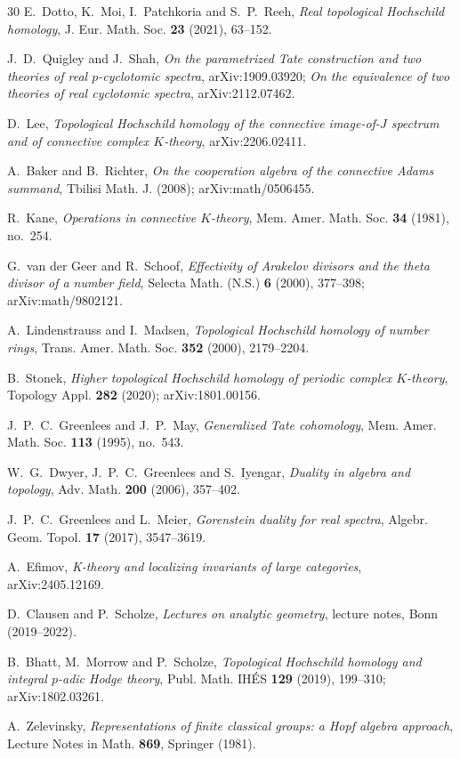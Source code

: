 \documentclass[11pt,reqno]{amsart}
\theoremstyle{plain}
\theoremstyle{definition}
\theoremstyle{remark}
\begin{document}
\begin{thebibliography}{30}
 E.~Dotto, K.~Moi, I.~Patchkoria and S.~P.~Reeh, \emph{Real topological
Hochschild homology}, J. Eur. Math. Soc. \textbf{23} (2021), 63--152.

 J.~D.~Quigley and J.~Shah, \emph{On the parametrized Tate construction and two
theories of real $p$-cyclotomic spectra}, arXiv:1909.03920; \emph{On the equivalence of two
theories of real cyclotomic spectra}, arXiv:2112.07462.

 D.~Lee, \emph{Topological Hochschild homology of the connective image-of-$J$
spectrum and of connective complex $K$-theory}, arXiv:2206.02411.

 A.~Baker and B.~Richter, \emph{On the cooperation algebra of the
connective Adams summand}, Tbilisi Math. J. (2008); arXiv:math/0506455.

 R.~Kane, \emph{Operations in connective $K$-theory}, Mem. Amer. Math. Soc.
\textbf{34} (1981), no.~254.

 G.~van der Geer and R.~Schoof, \emph{Effectivity of Arakelov divisors and the
theta divisor of a number field}, Selecta Math. (N.S.) \textbf{6} (2000), 377--398;
arXiv:math/9802121.

 A.~Lindenstrauss and I.~Madsen, \emph{Topological Hochschild homology of number
rings}, Trans. Amer. Math. Soc. \textbf{352} (2000), 2179--2204.

 B.~Stonek, \emph{Higher topological Hochschild homology of periodic complex
$K$-theory}, Topology Appl. \textbf{282} (2020); arXiv:1801.00156.

 J.~P.~C.~Greenlees and J.~P.~May, \emph{Generalized Tate cohomology},
Mem. Amer. Math. Soc. \textbf{113} (1995), no.~543.

 W.~G.~Dwyer, J.~P.~C.~Greenlees and S.~Iyengar, \emph{Duality in algebra and
topology}, Adv. Math. \textbf{200} (2006), 357--402.

 J.~P.~C.~Greenlees and L.~Meier, \emph{Gorenstein duality for real
spectra}, Algebr. Geom. Topol. \textbf{17} (2017), 3547--3619.

 A.~Efimov, \emph{K-theory and localizing invariants of large categories},
arXiv:2405.12169.

 D.~Clausen and P.~Scholze, \emph{Lectures on analytic geometry},
lecture notes, Bonn (2019--2022).

 B.~Bhatt, M.~Morrow and P.~Scholze, \emph{Topological Hochschild homology and
integral $p$-adic Hodge theory}, Publ. Math. IH\'ES \textbf{129} (2019), 199--310;
arXiv:1802.03261.

 A.~Zelevinsky, \emph{Representations of finite classical groups: a Hopf
algebra approach}, Lecture Notes in Math. \textbf{869}, Springer (1981).

\end{thebibliography}
\end{document}
